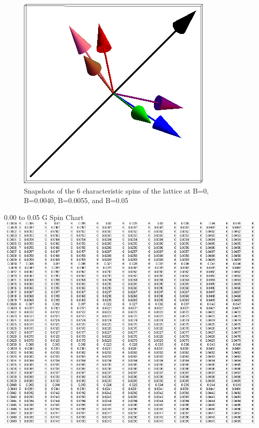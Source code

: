 \documentclass{article}
\begin{document}
\begin{figure}[ht]
\includegraphics[scale=0.27]{111_3000/501S000to005G.png}
\caption{Snapshots of the 6 characteristic spins of the lattice at B=0, B=0.0040, B=0.0055, and B=0.05}
\end{figure}
\clearpage

\begin{center}
\LARGE 0.00 to 0.05 G Spin Chart
 \includegraphics[keepaspectratio,scale=0.7]{111_3000/000to005SpinChart.png}
\end{center}
\pagebreak
\end{document}
